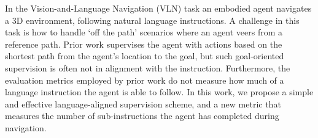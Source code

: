 In the Vision-and-Language Navigation (VLN) task an embodied agent navigates a 3D environment, following natural language instructions. A challenge in this task is how to handle ‘off the path' scenarios where an agent veers from a reference path. Prior work supervises the agent with actions based on the shortest path from the agent's location to the goal, but such goal-oriented supervision is often not in alignment with the instruction. Furthermore, the evaluation metrics employed by prior work do not measure how much of a language instruction the agent is able to follow. In this work, we propose a simple and effective language-aligned supervision scheme, and a new metric that measures the number of sub-instructions the agent has completed during navigation.
